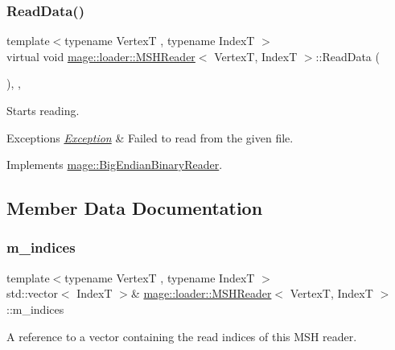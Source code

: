 \subsubsection{\texorpdfstring{Read\+Data()}{ReadData()}}
{\footnotesize\ttfamily template$<$typename VertexT , typename IndexT $>$ \\
virtual void \hyperlink{classmage_1_1loader_1_1_m_s_h_reader}{mage\+::loader\+::\+M\+S\+H\+Reader}$<$ VertexT, IndexT $>$\+::Read\+Data (\begin{DoxyParamCaption}{ }\end{DoxyParamCaption})\hspace{0.3cm}{\ttfamily [override]}, {\ttfamily [private]}, {\ttfamily [virtual]}}

Starts reading.


\begin{DoxyExceptions}{Exceptions}
{\em \hyperlink{classmage_1_1_exception}{Exception}} & Failed to read from the given file. \\
\hline
\end{DoxyExceptions}


Implements \hyperlink{classmage_1_1_big_endian_binary_reader_a7dc0689d598fa91308597b129516a11d}{mage\+::\+Big\+Endian\+Binary\+Reader}.



\subsection{Member Data Documentation}
\hypertarget{classmage_1_1loader_1_1_m_s_h_reader_a10ff2ab6abb709fbc044a9fa7f49624e}{}\label{classmage_1_1loader_1_1_m_s_h_reader_a10ff2ab6abb709fbc044a9fa7f49624e} 
\subsubsection{\texorpdfstring{m\+\_\+indices}{m\_indices}}
{\footnotesize\ttfamily template$<$typename VertexT , typename IndexT $>$ \\
std\+::vector$<$ IndexT $>$\& \hyperlink{classmage_1_1loader_1_1_m_s_h_reader}{mage\+::loader\+::\+M\+S\+H\+Reader}$<$ VertexT, IndexT $>$\+::m\+\_\+indices\hspace{0.3cm}{\ttfamily [private]}}

A reference to a vector containing the read indices of this M\+SH reader. \hypertarget{classmage_1_1loader_1_1_m_s_h_reader_ab4413e78d8e4dab29bf144aed59e33fd}{}\label{classmage_1_1loader_1_1_m_s_h_reader_ab4413e78d8e4dab29bf144aed59e33fd} 
